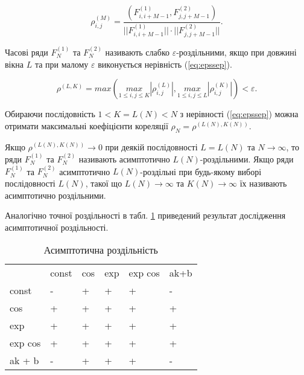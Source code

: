 \begin{equation}\label{eq:koefkor}
\rho_{i,j}^{(M)} = \frac{(F_{i,i+M-1}^{(1)}, F_{j,j+M-1}^{(2)})}{||F_{i,i+M-1}^{(1)}|| \cdot ||F_{j,j+M-1}^{(2)}||}.
\end{equation}


\vspace{1.5em}

Часові ряди $F_{N}^{(1)}$ та $F_{N}^{(2)}$ називають слабко $\varepsilon$-роздільними, якщо при довжині вікна $L$ та при малому $\varepsilon$ виконується нерівність (\ref{eq:epssep}).

\begin{equation}\label{eq:epssep}
\rho^{(L,K)} = max(\underset{1 \le i,j \le K}{max}|\rho_{i,j}^{(L)}|, \underset{1 \le i,j \le L}{max}|\rho_{i,j}^{(K)}|) < \varepsilon.
\end{equation}

Обираючи послідовність $1 < K = L(N) <  N$ з нерівності (\ref{eq:epssep}) можна отримати максимальні коефіцієнти кореляції $\rho_{N} = \rho^{(L(N),K(N))}$.

Якщо $\rho^{(L(N),K(N))} \longrightarrow 0$ при деякій послідовності $L=L(N)$ та $N \longrightarrow \infty$, то ряди $F_{N}^{(1)}$ та $F_{N}^{(2)}$ називають асимптотично $L(N)$-роздільними. Якщо ряди $F_{N}^{(1)}$ та $F_{N}^{(2)}$ асимптотично $L(N)$-роздільні при будь-якому виборі послідовності $L(N)$, такої що $L(N) \longrightarrow \infty$ та $K(N) \longrightarrow \infty$ їх називають асимптотично роздільними.

Аналогічно точної роздільності в табл. \ref{tab:assep} приведений результат дослідження асимптотичної роздільності.

\begin{table}[h]
	\captionstyle{ \raggedright}
	\caption{Асимптотична роздільність}\label{tab:assep}
	\begin{tabular}{| m{} | m{} | m{} | m{} | m{} | m{} |}
	\hline
	 & const & cos & exp & exp cos & ak+b \\
	\hlinewd{2pt}
	const & - & + & + & + & - \\
	\hline
	cos & + & + & + & + & + \\
	\hline
	exp & + & + & + & + & + \\
	\hline
	exp cos & + & + & + & + & + \\
	\hline
	ak + b & - & + & + & + & - \\
	\hline
	\end{tabular}
\end{table}


